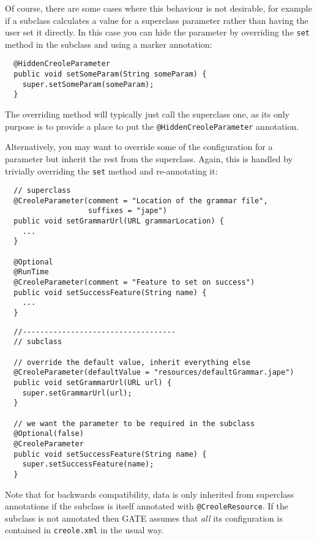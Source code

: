 Of course, there are some cases where this behaviour is not desirable, for
example if a subclass calculates a value for a superclass parameter rather than
having the user set it directly.  In this case you can hide the parameter by
overriding the {\tt set} method in the subclass and using a marker annotation:
\begin{lstlisting}
  @HiddenCreoleParameter
  public void setSomeParam(String someParam) {
    super.setSomeParam(someParam);
  }
\end{lstlisting}

The overriding method will typically just call the superclass one, as its only
purpose is to provide a place to put the \verb|@HiddenCreoleParameter|
annotation.

Alternatively, you may want to override some of the configuration for a
parameter but inherit the rest from the superclass.  Again, this is handled by
trivially overriding the {\tt set} method and re-annotating it:
\begin{lstlisting}
  // superclass
  @CreoleParameter(comment = "Location of the grammar file",
                   suffixes = "jape")
  public void setGrammarUrl(URL grammarLocation) {
    ...
  }

  @Optional
  @RunTime
  @CreoleParameter(comment = "Feature to set on success")
  public void setSuccessFeature(String name) {
    ...
  }
\end{lstlisting}
\begin{lstlisting}
  //-----------------------------------
  // subclass
  
  // override the default value, inherit everything else
  @CreoleParameter(defaultValue = "resources/defaultGrammar.jape")
  public void setGrammarUrl(URL url) {
    super.setGrammarUrl(url);
  }

  // we want the parameter to be required in the subclass
  @Optional(false)
  @CreoleParameter
  public void setSuccessFeature(String name) {
    super.setSuccessFeature(name);
  }
\end{lstlisting}

Note that for backwards compatibility, data is only inherited from superclass
annotations if the subclass is itself annotated with \verb|@CreoleResource|.
If the subclass is not annotated then GATE assumes that \emph{all} its
configuration is contained in {\tt creole.xml} in the usual way.


